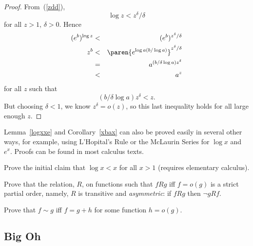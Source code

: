 \begin{proof}
From~(\ref{zdd}),
\[   %
\log z  <  z^{\delta}/\delta
\]   %
for all $z>1$, $\delta >0$.  
Hence
\begin{eqnarray*}
(e^b)^{\log z} & < & (e^b)^{z^{\delta}/\delta}\\ %
z^b & < & \paren{e^{\log a (b/\log a)}}^{z^{\delta}/\delta}\\ %
    & = & a^{(b/\delta\log a) z^{\delta}}\\ %
    & < & a^z  %
\end{eqnarray*}
for all $z$ such that
\[
(b/\delta\log a) z^{\delta} <z.
\]
But choosing $\delta < 1$, we know $z^{\delta} = o(z)$, so this last
inequality holds for all large enough $z$.
\end{proof}

Lemma~\ref{logxxe} and Corollary~\ref{xbax} can also be proved easily in
several other ways, for example, using L'Hopital's Rule or the McLaurin
Series for $\log x$ and $e^x$.  Proofs can be found in most calculus
texts.

\begin{problem}
Prove the initial claim that $\log x < x$ for all $x >1$ (requires
elementary calculus).
\end{problem}

\begin{problem}
Prove that the relation, $R$, on functions such that $fRg$ iff $f = o(g)$
is a strict partial order, namely, $R$ is transitive and \emph{asymmetric}:
if $fRg$ then $\neg gRf$.
\end{problem}

\begin{problem}
Prove that $f \sim g$ iff $f = g + h$ for some function $h = o(g)$.
\end{problem}

\subsection{Big Oh}

